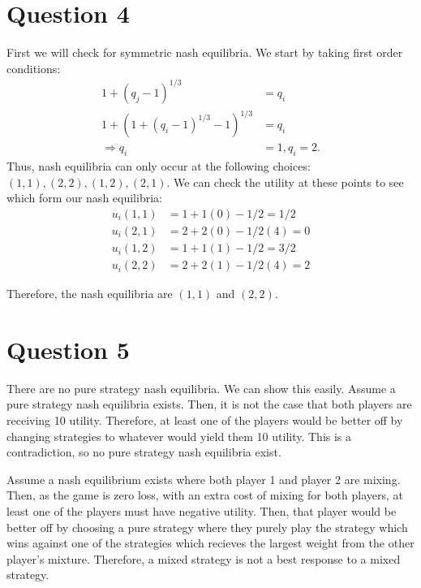 \documentclass[11pt]{article} %
\begin{document}
\section{Question 4}
First we will check for symmetric nash equilibria. We start by taking first order conditions:
\begin{align*}
1+(q_j - 1)^{1/3} &= q_i\\
1+(1+(q_i - 1)^{1/3} - 1)^{1/3} &= q_i\\
\Rightarrow q_i &= 1, q_i = 2.
\end{align*}
Thus, nash equilibria can only occur at the following choices: $(1,1),(2,2),(1,2),(2,1)$. We can check the utility at these points to see which form our nash equilibria:
\begin{align*}
u_i(1,1) &= 1+1(0) - 1/2 = 1/2\\
u_i(2,1) &= 2+2(0) - 1/2(4) = 0\\
u_i(1,2) &= 1+1(1) - 1/2 = 3/2\\
u_i(2,2) &= 2+2(1) - 1/2(4) = 2
\end{align*}

Therefore, the nash equilibria are $(1,1)$ and $(2,2)$.
\section{Question 5}

There are no pure strategy nash equilibria. We can show this easily. Assume a pure strategy nash equilibria exists. Then, it is not the case that both players are receiving 10 utility. Therefore, at least one of the players would be better off by changing strategies to whatever would yield them 10 utility. This is a contradiction, so no pure strategy nash equilibria exist.

Assume a nash equilibrium exists where both player 1 and player 2 are mixing. Then, as the game is zero loss, with an extra cost of mixing for both players, at least one of the players must have negative utility. Then, that player would be better off by choosing a pure strategy where they purely play the strategy which wins against one of the strategies which recieves the largest weight from the other player's mixture. Therefore, a mixed strategy is not a best response to a mixed strategy.
\end{document}
